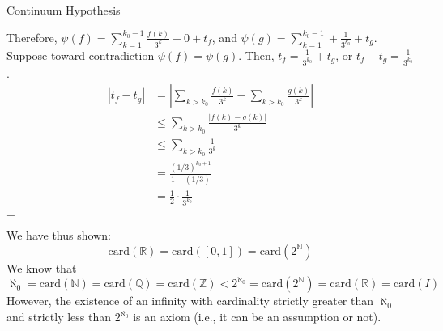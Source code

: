 \documentclass[10pt]{extarticle}
\newcommand{\card}{\text{card}}
\newcommand{\N}{\mathbb{N}}
\newcommand{\Q}{\mathbb{Q}}
\newcommand{\Z}{\mathbb{Z}}
\newcommand{\R}{\mathbb{R}}
\begin{document}
\begin{problem}{Continuum Hypothesis}
\begin{description}
          Therefore, $\psi(f) = \sum_{k = 1}^{k_0-1}\frac{f(k)}{3^k} + 0 + t_f$, and $\psi(g) = \sum_{k=1}^{k_0-1} + \frac{1}{3^{k_0}} + t_g$.\\

          Suppose toward contradiction $\psi(f) = \psi(g)$. Then, $t_f = \frac{1}{3^{k_0}} + t_g$, or $t_f - t_g = \frac{1}{3^{k_0}}$.
          \begin{align*}
            |t_f-t_g| &= |\sum_{k>k_0}\frac{f(k)}{3^k} - \sum_{k>k_0}\frac{g(k)}{3^k}|\\
                      &\leq \sum_{k>k_0}\frac{|f(k)-g(k)|}{3^k}\\
                      &\leq \sum_{k>k_0}\frac{1}{3^{k}}\\
                      &= \frac{(1/3)^{k_0+1}}{1-(1/3)}\\
                      &= \frac{1}{2}\cdot\frac{1}{3^{k_0}}
          \end{align*}
          $\bot$
    \end{description}
    We have thus shown:
    \[
      \card(\R) = \card([0,1]) = \card(2^{\N})
    \] 
    We know that \[\aleph_0 = \card(\N) = \card(\Q) = \card(\Z) < 2^{\aleph_0} = \card(2^{\N}) = \card(\R) = \card(I)\] However, the existence of an infinity with cardinality strictly greater than $\aleph_0$ and strictly less than $2^{\aleph_0}$ is an axiom (i.e., it can be an assumption or not).
  \end{problem}
\end{document}
